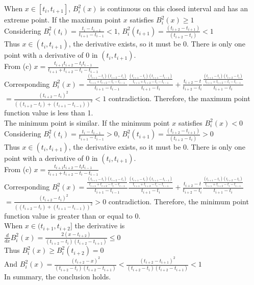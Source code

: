 \documentclass[a4paper]{article}
\begin{document}
When \( x \in [t_i, t_{i+1}] \), \( B_i^2(x) \) is continuous on this closed interval and has an extreme point. If the maximum point \( x \) satisfies \( B^2_i(x) \geq 1 \) \\
Considering \( B_i^2(t_i) = \frac{t_i-t_{i-1}}{t_{i+1}-t_{i-1}} < 1 \), \( B_i^2(t_{i+1}) = \frac{(t_{i+2}-t_{i+1})}{(t_{i+2} - t_i)} < 1 \) \\
Thus \( x \in (t_i, t_{i+1}) \), the derivative exists, so it must be 0. There is only one point with a derivative of 0 in \( (t_i, t_{i+1}) \). \\
From (c) \( x = \frac{t_{i+1}t_{i+2}-t_{i}t_{i-1}}{t_{i+1}+t_{i+2}-t_{i}-t_{i-1}} \) \\
Corresponding \( B^2_i(x) = \frac{\frac{(t_{i+1}-t_i)(t_{i+2}-t_i)}{t_{i+1}+t_{i+2}-t_{i}-t_{i-1}}}{t_{i+1} - t_{i-1}} \frac{\frac{(t_{i+1}-t_i)(t_{i+1}-t_{i-1})}{t_{i+1}+t_{i+2}-t_{i}-t_{i-1}}}{t_{i+1}-t_i} + \frac{t_{i+2} - t}{t_{i+2} - t_i} \frac{\frac{(t_{i+1}-t_i)(t_{i+2}-t_i)}{t_{i+1}+t_{i+2}-t_{i}-t_{i-1}}}{t_{i+1}-t_i} \) \\
\( = \frac{(t_{i+2}-t_i)^2}{((t_{i+2}-t_i)+(t_{i+1}-t_{i-1}))^2} < 1 \) contradiction. Therefore, the maximum point function value is less than 1. \\
The minimum point is similar. If the minimum point \( x \) satisfies \( B^2_i(x) < 0 \) \\
Considering \( B_i^2(t_i) = \frac{t_i-t_{i-1}}{t_{i+1}-t_{i-1}} > 0 \), \( B_i^2(t_{i+1}) = \frac{(t_{i+2}-t_{i+1})}{(t_{i+2} - t_i)} > 0 \) \\
Thus \( x \in (t_i, t_{i+1}) \), the derivative exists, so it must be 0. There is only one point with a derivative of 0 in \( (t_i, t_{i+1}) \). \\
From (c) \( x = \frac{t_{i+1}t_{i+2}-t_{i}t_{i-1}}{t_{i+1}+t_{i+2}-t_{i}-t_{i-1}} \) \\
Corresponding \( B^2_i(x) = \frac{\frac{(t_{i+1}-t_i)(t_{i+2}-t_i)}{t_{i+1}+t_{i+2}-t_{i}-t_{i-1}}}{t_{i+1} - t_{i-1}} \frac{\frac{(t_{i+1}-t_i)(t_{i+1}-t_{i-1})}{t_{i+1}+t_{i+2}-t_{i}-t_{i-1}}}{t_{i+1}-t_i} + \frac{t_{i+2} - t}{t_{i+2} - t_i} \frac{\frac{(t_{i+1}-t_i)(t_{i+2}-t_i)}{t_{i+1}+t_{i+2}-t_{i}-t_{i-1}}}{t_{i+1}-t_i} \) \\
\( = \frac{(t_{i+2}-t_i)^2}{((t_{i+2}-t_i)+(t_{i+1}-t_{i-1}))^2} > 0 \) contradiction. Therefore, the minimum point function value is greater than or equal to 0. \\
When \( x \in (t_{i+1}, t_{i+2}] \) the derivative is \\
\( \frac{d}{dx}B^2_i(x) = \frac{2(x-t_{i+2})}{(t_{i+2}-t_{i})(t_{i+2}-t_{i+1})} \leq 0 \) \\
Thus \( B^2_i(x) \geq B^2_i(t_{i+2}) = 0 \) \\
And \( B^2_i(x) = \frac{(t_{i+2}-x)^2}{(t_{i+2} - t_i)(t_{i+2}-t_{i+1})} < \frac{(t_{i+2}-t_{i+1})^2}{(t_{i+2} - t_i)(t_{i+2}-t_{i+1})} < 1 \) \\
In summary, the conclusion holds. \\
\end{document}
